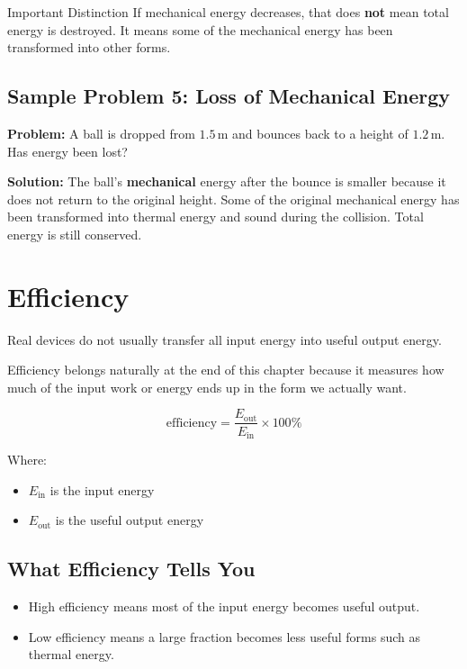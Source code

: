 \begin{pitfall}{Important Distinction}
If mechanical energy decreases, that does \textbf{not} mean total energy is destroyed. It means some of the mechanical energy has been transformed into other forms.
\end{pitfall}

\subsection*{Sample Problem 5: Loss of Mechanical Energy}
\textbf{Problem:} A ball is dropped from $1.5\,\text{m}$ and bounces back to a height of $1.2\,\text{m}$. Has energy been lost?

\textbf{Solution:}
The ball's \textbf{mechanical} energy after the bounce is smaller because it does not return to the original height. Some of the original mechanical energy has been transformed into thermal energy and sound during the collision. Total energy is still conserved.

\section{Efficiency}
Real devices do not usually transfer all input energy into useful output energy.

Efficiency belongs naturally at the end of this chapter because it measures how much of the input work or energy ends up in the form we actually want.

\begin{equation}
    \text{efficiency} = \frac{E_{\text{out}}}{E_{\text{in}}} \times 100\%
\end{equation}

Where:
\begin{itemize}
    \item $E_{\text{in}}$ is the input energy
    \item $E_{\text{out}}$ is the useful output energy
\end{itemize}

\subsection{What Efficiency Tells You}
\begin{itemize}
    \item High efficiency means most of the input energy becomes useful output.
    \item Low efficiency means a large fraction becomes less useful forms such as thermal energy.
\end{itemize}

